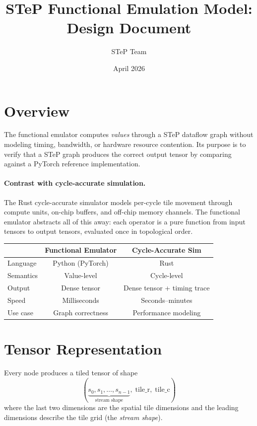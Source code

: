 \documentclass[11pt]{article}
\title{STeP Functional Emulation Model:\\Design Document}
\author{STeP Team}
\date{April 2026}
\begin{document}
\maketitle

\section{Overview}

The functional emulator computes \emph{values} through a STeP dataflow graph without modeling timing, bandwidth, or hardware resource contention.
Its purpose is to verify that a STeP graph produces the correct output tensor by comparing against a PyTorch reference implementation.

\paragraph{Contrast with cycle-accurate simulation.}
The Rust cycle-accurate simulator models per-cycle tile movement through compute units, on-chip buffers, and off-chip memory channels.
The functional emulator abstracts all of this away: each operator is a pure function from input tensors to output tensors, evaluated once in topological order.

\begin{center}
\begin{tabular}{lcc}
\toprule
& \textbf{Functional Emulator} & \textbf{Cycle-Accurate Sim} \\
\midrule
Language        & Python (PyTorch)  & Rust \\
Semantics       & Value-level       & Cycle-level \\
Output          & Dense tensor      & Dense tensor + timing trace \\
Speed           & Milliseconds      & Seconds--minutes \\
Use case        & Graph correctness & Performance modeling \\
\bottomrule
\end{tabular}
\end{center}

\section{Tensor Representation}

Every node produces a tiled tensor of shape
\[
  (\underbrace{s_0, s_1, \ldots, s_{n-1}}_{\text{stream shape}},\; \text{tile\_r},\; \text{tile\_c})
\]
where the last two dimensions are the spatial tile dimensions and the leading dimensions describe the tile grid (the \emph{stream shape}).
\end{document}
